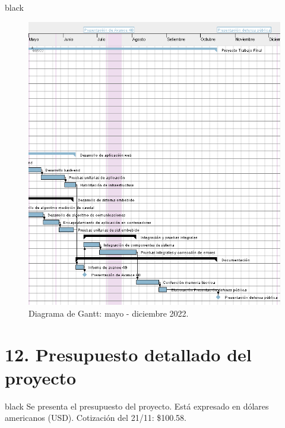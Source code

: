 \documentclass[
11pt, %
codirector, %
]{charter}
\begin{document}
\begin{consigna}{black}
\begin{figure}[htpb]
\centering 
\includegraphics[height=.7\textheight]{./Figuras/TF-gantt2.png}
\caption{Diagrama de Gantt: mayo - diciembre 2022.}
\label{fig:diagGantt2}
\end{figure}


\end{consigna}


\section{12. Presupuesto detallado del proyecto}
\label{sec:presupuesto}

\begin{consigna}{black}
Se presenta el presupuesto del proyecto. Está expresado en dólares americanos (USD). Cotización del 21/11: \$100.58.

\end{consigna}
\end{document}
